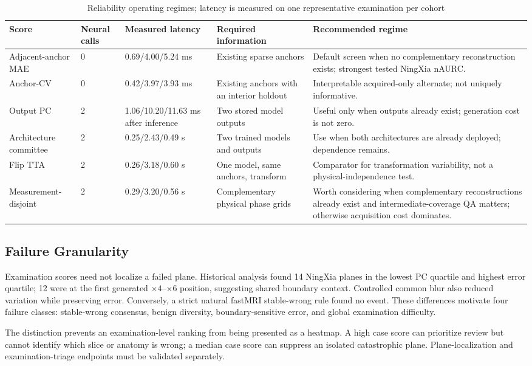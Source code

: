 \documentclass[journal,10pt]{IEEEtran}
\begin{document}
\begin{table}[t]
\caption{Reliability operating regimes; latency is measured on one representative examination per cohort}
\label{tab:operating-regime}\centering
\begin{tabular}{p{3.0cm}p{2.1cm}p{2.5cm}p{3.2cm}p{4.6cm}}
\toprule
Score&Neural calls&Measured latency&Required information&Recommended regime\\
\midrule
Adjacent-anchor MAE&0&0.69/4.00/5.24 ms&Existing sparse anchors&Default screen when no complementary reconstruction exists; strongest tested NingXia nAURC.\\
Anchor-CV&0&0.42/3.97/3.93 ms&Existing anchors with an interior holdout&Interpretable acquired-only alternate; not uniquely informative.\\
Output PC&2&1.06/10.20/11.63 ms after inference&Two stored model outputs&Useful only when outputs already exist; generation cost is not zero.\\
Architecture committee&2&0.25/2.43/0.49 s&Two trained models and outputs&Use when both architectures are already deployed; dependence remains.\\
Flip TTA&2&0.26/3.18/0.60 s&One model, same anchors, transform&Comparator for transformation variability, not a physical-independence test.\\
Measurement-disjoint&2&0.29/3.20/0.56 s&Complementary physical phase grids&Worth considering when complementary reconstructions already exist and intermediate-coverage QA matters; otherwise acquisition cost dominates.\\
\bottomrule
\end{tabular}
\end{table}

\subsection{Failure Granularity}
Examination scores need not localize a failed plane. Historical analysis found 14 NingXia planes in the lowest PC quartile and highest error quartile; 12 were at the first generated $\times4$--$\times6$ position, suggesting shared boundary context. Controlled common blur also reduced variation while preserving error. Conversely, a strict natural fastMRI stable-wrong rule found no event. These differences motivate four failure classes: stable-wrong consensus, benign diversity, boundary-sensitive error, and global examination difficulty.

The distinction prevents an examination-level ranking from being presented as a heatmap. A high case score can prioritize review but cannot identify which slice or anatomy is wrong; a median case score can suppress an isolated catastrophic plane. Plane-localization and examination-triage endpoints must be validated separately.
\end{document}
